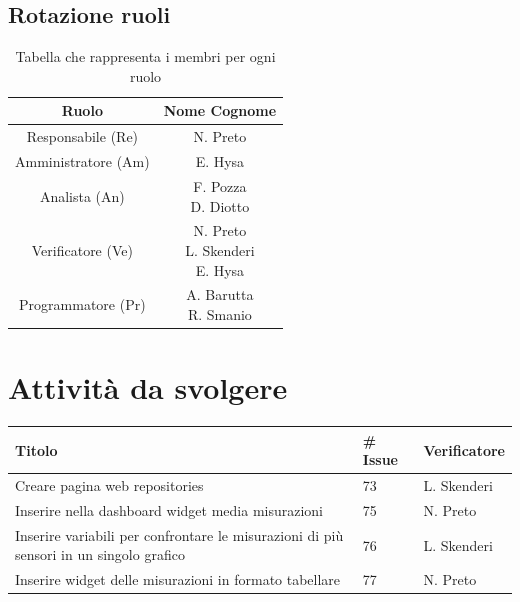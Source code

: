 \documentclass{article}
\begin{document}
    \subsection{Rotazione ruoli}
    \begin{table}[H]
        \centering
        \begin{tabular}{|c|c|} 
            \hline
            \textbf{Ruolo} & \textbf{Nome Cognome} \\
            \hline \hline
            Responsabile (Re) & N. Preto \\ 
            \hline
            Amministratore (Am) & E. Hysa \\ 
            \hline
            Analista (An) & \makecell{F. Pozza\\D. Diotto} \\
            \hline
            Verificatore (Ve) & \makecell{N. Preto\\L. Skenderi\\E. Hysa} \\
            \hline
            Programmatore (Pr) & \makecell{A. Barutta\\R. Smanio} \\
            \hline
        \end{tabular}
        \caption{Tabella che rappresenta i membri per ogni ruolo}
    \end{table}

\section{Attività da svolgere}
    \begin{center}
        \begin{tabular}{|C{7cm}|C{1,5cm}|C{3cm}|}
            \hline
            \textbf{Titolo} & \textbf{\# Issue} & \textbf{Verificatore} \\
            \hline\hline
            Creare pagina web repositories & 73 & L. Skenderi \\
            Inserire nella dashboard widget media misurazioni & 75 & N. Preto \\
            Inserire variabili per confrontare le misurazioni di più sensori in un singolo grafico & 76 & L. Skenderi \\
            Inserire widget delle misurazioni in formato tabellare  & 77 & N. Preto \\
            \hline
        \end{tabular}
    \end{center}
\end{document}
